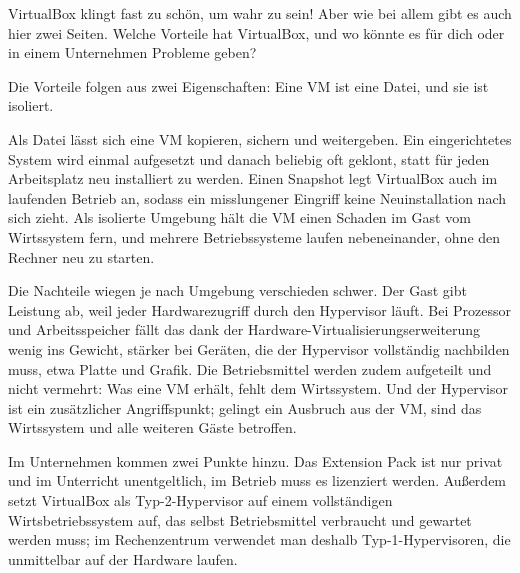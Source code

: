 \begin{aufgabe}
VirtualBox klingt fast zu schön, um wahr zu sein! Aber wie bei allem gibt es auch hier zwei Seiten. Welche Vorteile hat VirtualBox, und wo könnte es für dich oder in einem Unternehmen Probleme geben?
\end{aufgabe}

Die Vorteile folgen aus zwei Eigenschaften: Eine VM ist eine Datei, und sie ist isoliert.

Als Datei lässt sich eine VM kopieren, sichern und weitergeben. Ein eingerichtetes System wird einmal aufgesetzt und danach beliebig oft geklont, statt für jeden Arbeitsplatz neu installiert zu werden. Einen Snapshot legt VirtualBox auch im laufenden Betrieb an, sodass ein misslungener Eingriff keine Neuinstallation nach sich zieht. Als isolierte Umgebung hält die VM einen Schaden im Gast vom Wirtssystem fern, und mehrere Betriebssysteme laufen nebeneinander, ohne den Rechner neu zu starten.

Die Nachteile wiegen je nach Umgebung verschieden schwer. Der Gast gibt Leistung ab, weil jeder Hardwarezugriff durch den Hypervisor läuft. Bei Prozessor und Arbeitsspeicher fällt das dank der Hardware-Virtualisierungserweiterung wenig ins Gewicht, stärker bei Geräten, die der Hypervisor vollständig nachbilden muss, etwa Platte und Grafik. Die Betriebsmittel werden zudem aufgeteilt und nicht vermehrt: Was eine VM erhält, fehlt dem Wirtssystem. Und der Hypervisor ist ein zusätzlicher Angriffspunkt; gelingt ein Ausbruch aus der VM, sind das Wirtssystem und alle weiteren Gäste betroffen.

Im Unternehmen kommen zwei Punkte hinzu. Das Extension Pack ist nur privat und im Unterricht unentgeltlich, im Betrieb muss es lizenziert werden. Außerdem setzt VirtualBox als Typ-2-Hypervisor auf einem vollständigen Wirtsbetriebssystem auf, das selbst Betriebsmittel verbraucht und gewartet werden muss; im Rechenzentrum verwendet man deshalb Typ-1-Hypervisoren, die unmittelbar auf der Hardware laufen.

